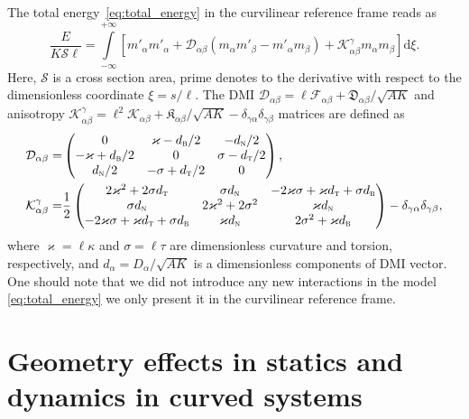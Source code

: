 \documentclass[runningheads]{llncs}
\begin{document}
The total energy~\eqref{eq:total_energy} in the curvilinear reference frame reads as
\begin{equation}\label{eq:totalEnergy_FrenetSerret}
\frac{E}{K\mathcal{S}\ell}=\int\limits_{-\infty}^{+\infty}\left[m'_\alpha m'_\alpha+\mathcal{D}_{\alpha\beta}\left(m_\alpha m'_\beta - m'_\alpha m_\beta\right)+\mathcal{K}^{\gamma}_{\alpha\beta}m_\alpha m_\beta\right]\mathrm{d}\xi.
\end{equation}
Here, $\mathcal{S}$ is a cross section area, prime denotes to the derivative with respect to the dimensionless coordinate $\xi=s/\ell$. The DMI $\mathcal{D}_{\alpha\beta}=\ell\mathcal{F}_{\alpha\beta}+\mathfrak{D}_{\alpha\beta}/\sqrt{AK}$ and anisotropy $\mathcal{K}^\gamma_{\alpha\beta}=\ell^2\mathcal{K}_{\alpha\beta}+\mathfrak{K}_{\alpha\beta}/\sqrt{AK}-\delta_{\gamma\alpha}\delta_{\gamma\beta}$ matrices are defined as
\begin{equation}
\begin{split}
\mathcal{D}_{\alpha\beta}=&\left(\begin{matrix}
	0&\varkappa-d_\textsc{b}/2&-d_\textsc{n}/2\\
	-\varkappa+d_\textsc{b}/2&0&\sigma-d_\textsc{t}/2\\
	d_\textsc{n}/2&-\sigma+d_\textsc{t}/2&0
\end{matrix}\right),\\
\mathcal{K}_{\alpha\beta}^\gamma=&\frac{1}{2}\left(\begin{matrix}
2\varkappa^2+2\sigma d_\textsc{t}&\sigma d_\textsc{n}&-2\varkappa\sigma+\varkappa d_\textsc{t}+\sigma d_\textsc{b}\\
\sigma d_\textsc{n}&2\varkappa^2+2\sigma^2&\varkappa d_\textsc{n}\\
-2\varkappa\sigma+\varkappa d_\textsc{t}+\sigma d_\textsc{b}&\varkappa d_\textsc{n}&2\sigma^2+\varkappa d_\textsc{b}
\end{matrix}\right)-\delta_{\gamma\alpha}\delta_{\gamma\beta},
\end{split}
\end{equation}
where $\varkappa=\ell \kappa$ and $\sigma=\ell\tau$ are dimensionless curvature and torsion, respectively, and $d_\alpha=D_\alpha/\sqrt{AK}$ is a dimensionless components of DMI vector. One should note that we did not introduce any new interactions in the model \eqref{eq:total_energy} we only present it in the curvilinear reference frame.
\section{Geometry effects in statics and dynamics in curved systems}\label{sec:effects_1D}
\end{document}
